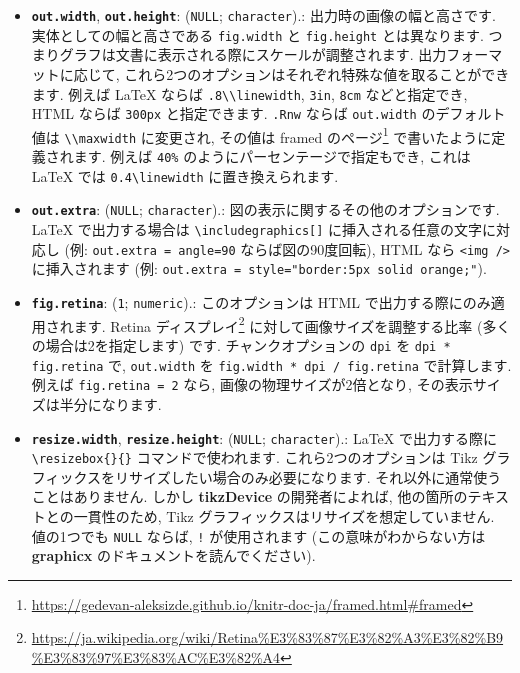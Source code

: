 \documentclass[
  11pt,
  lualatex,
  ja=standard]{bxjsreport}
\renewcommand{\href}[2]{#2\footnote{\url{#1}}}
\begin{document}
\begin{itemize}
\item
  \textbf{\texttt{out.width}}, \textbf{\texttt{out.height}}: (\texttt{NULL}; \texttt{character}).: 出力時の画像の幅と高さです. 実体としての幅と高さである \texttt{fig.width} と \texttt{fig.height} とは異なります. つまりグラフは文書に表示される際にスケールが調整されます. 出力フォーマットに応じて, これら2つのオプションはそれぞれ特殊な値を取ることができます. 例えば LaTeX ならば \texttt{.8\textbackslash{}\textbackslash{}linewidth}, \texttt{3in}, \texttt{8cm} などと指定でき, HTML ならば \texttt{300px} と指定できます. \texttt{.Rnw} ならば \texttt{out.width} のデフォルト値は \texttt{\textbackslash{}\textbackslash{}maxwidth} に変更され, その値は \href{https://gedevan-aleksizde.github.io/knitr-doc-ja/framed.html\#framed}{framed のページ} で書いたように定義されます. 例えば \texttt{\textquotesingle{}40\%\textquotesingle{}} のようにパーセンテージで指定もでき, これは LaTeX では \texttt{0.4\textbackslash{}linewidth} に置き換えられます.
\item
  \textbf{\texttt{out.extra}}: (\texttt{NULL}; \texttt{character}).: 図の表示に関するその他のオプションです. LaTeX で出力する場合は \texttt{\textbackslash{}includegraphics{[}{]}} に挿入される任意の文字に対応し (例: \texttt{out.extra = \textquotesingle{}angle=90\textquotesingle{}} ならば図の90度回転), HTML なら \texttt{\textless{}img\ /\textgreater{}} に挿入されます (例: \texttt{out.extra = \textquotesingle{}style="border:5px\ solid\ orange;"\textquotesingle{}}).
\item
  \textbf{\texttt{fig.retina}}: (\texttt{1}; \texttt{numeric}).: このオプションは HTML で出力する際にのみ適用されます. \href{https://ja.wikipedia.org/wiki/Retina\%E3\%83\%87\%E3\%82\%A3\%E3\%82\%B9\%E3\%83\%97\%E3\%83\%AC\%E3\%82\%A4}{Retina ディスプレイ} に対して画像サイズを調整する比率 (多くの場合は2を指定します) です. チャンクオプションの \texttt{dpi} を \texttt{dpi * fig.retina} で, \texttt{out.width} を \texttt{fig.width * dpi / fig.retina} で計算します. 例えば \texttt{fig.retina = 2} なら, 画像の物理サイズが2倍となり, その表示サイズは半分になります.
\item
  \textbf{\texttt{resize.width}}, \textbf{\texttt{resize.height}}: (\texttt{NULL}; \texttt{character}).: LaTeX で出力する際に \texttt{\textbackslash{}resizebox\{\}\{\}} コマンドで使われます. これら2つのオプションは Tikz グラフィックスをリサイズしたい場合のみ必要になります. それ以外に通常使うことはありません. しかし \textbf{tikzDevice} の開発者によれば, 他の箇所のテキストとの一貫性のため, Tikz グラフィックスはリサイズを想定していません. 値の1つでも \texttt{NULL} ならば, \texttt{!} が使用されます (この意味がわからない方は \textbf{graphicx} のドキュメントを読んでください).

\end{itemize}
\end{document}
